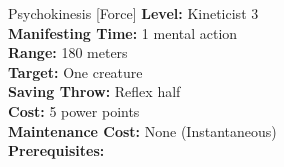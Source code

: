 {Psychokinesis [Force]}
{
	\textbf{Level:}
	Kineticist 3\\
	\textbf{Manifesting Time:}
	1 mental action\\
	\textbf{Range:}
	180 meters\\
	\textbf{Target:}
	One creature\\
	\textbf{Saving Throw:}
	Reflex half\\
	\textbf{Cost:}
	5 power points\\
	\textbf{Maintenance Cost:}
	None (Instantaneous)\\
	\textbf{Prerequisites:}
	\\
}
{
	
}